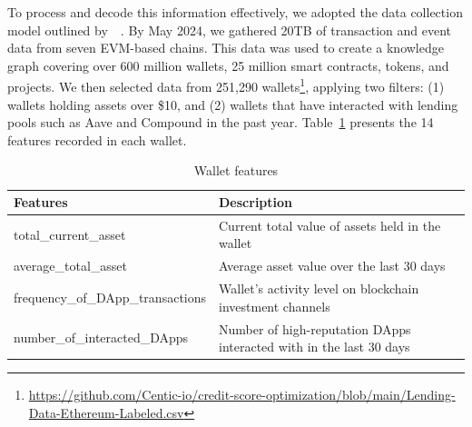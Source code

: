 \documentclass[runningheads]{llncs}
\begin{document}
{To process and decode this information effectively, we adopted the data collection model outlined by~\citeauthor{pham2022analysis}~\cite{pham2022analysis}. %
By May 2024, we gathered 20TB of transaction and event data from seven EVM-based chains. %
This data was used to create a knowledge graph covering over 600 million wallets, 25 million smart contracts,  tokens, and  projects. We then selected data from 251,290 wallets\footnote{\href{https://github.com/Centic-io/credit-score-optimization/blob/main/Lending-Data-Ethereum-Labeled.csv}{https://github.com/Centic-io/credit-score-optimization/blob/main/Lending-Data-Ethereum-Labeled.csv}}, applying two filters: (1) wallets holding assets over \$10, and (2) wallets that have interacted with lending pools such as Aave and Compound in the past year. Table~\ref{tab1} presents the 14 features recorded in each wallet.
\begin{table}[htbp]
    \fontsize{6pt}{12pt}\selectfont
    \centering
    \caption{Wallet features}\label{tab1} %
    \begin{tabular}{|l|m{8.5cm}|} %
        \hline
        \textbf{Features} & \textbf{Description} \\ %
        \hline
        total\_current\_asset & Current total value of assets held in the wallet \\ \hline
        average\_total\_asset & Average asset value over the last 30 days \\ \hline
        frequency\_of\_DApp\_transactions & Wallet's activity level on blockchain investment channels \\ \hline
        number\_of\_interacted\_DApps & Number of high-reputation DApps interacted with in the last 30 days \\ \hline

\end{tabular}
\end{table}}
\end{document}
